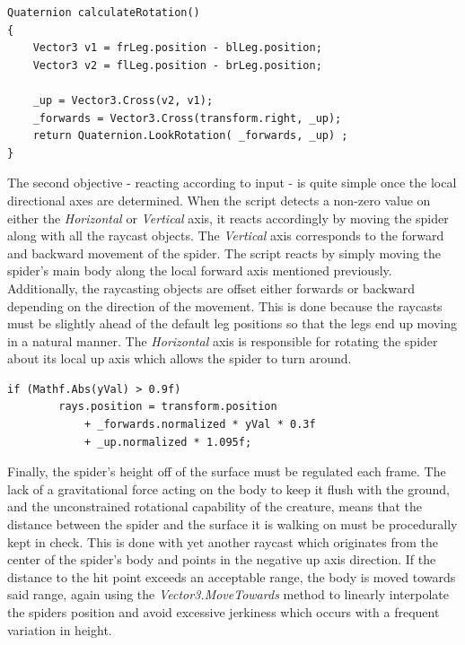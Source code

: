 \begin{lstlisting}[basicstyle=\footnotesize, numbers=none,frame=single,
caption={Calculating the spider's rotation. \textit{IKSpiderMovement.cs}},captionpos=b, label=rotation, language={[Sharp]c}]
Quaternion calculateRotation()
{
    Vector3 v1 = frLeg.position - blLeg.position;
    Vector3 v2 = flLeg.position - brLeg.position;
    
    _up = Vector3.Cross(v2, v1);
    _forwards = Vector3.Cross(transform.right, _up);
    return Quaternion.LookRotation( _forwards, _up) ;
}
\end{lstlisting}


The second objective - reacting according to input - is quite simple once the
local directional axes are determined. When the script detects a non-zero value
on either the \textit{Horizontal} or \textit{Vertical} axis, it reacts
accordingly by moving the spider along with all the raycast objects. The
\textit{Vertical} axis corresponds to the forward and backward movement of the
spider. The script reacts by simply moving the spider's main body along the
local forward axis mentioned previously. Additionally, the raycasting objects
are offset either forwards or backward depending on the direction of the
movement. This is done because the raycasts must be slightly ahead of the
default leg positions so that the legs end up moving in a natural manner.
The \textit{Horizontal} axis is responsible for rotating the spider about its
local up axis which allows the spider to turn around. 

\begin{lstlisting}[basicstyle=\footnotesize, numbers=none,frame=single,
caption={The raycasts which scan the terrain for leg placement positions are
offset in the direction in which the spider is walking. The \textit{yVal}
variable is the value of the \textit{Vertical} axis input. \textit{IKSpiderMovement.cs}},captionpos=b,
label=ray_offset, language={[Sharp]c}, float=tp]
    if (Mathf.Abs(yVal) > 0.9f)
        rays.position = transform.position
            + _forwards.normalized * yVal * 0.3f
            + _up.normalized * 1.095f;
\end{lstlisting}

Finally, the spider's height off of the surface must be regulated each frame.
The lack of a gravitational force acting on the body to keep it flush with the
ground, and the unconstrained rotational capability of the creature, means that
the distance between the spider and the surface it is walking on must be
procedurally kept in check. This is done with yet another raycast which
originates from the center of the spider's body and points in the negative up
axis direction. If the distance to the hit point exceeds an acceptable range,
the body is moved towards said range, again using the
\textit{Vector3.MoveTowards} method to linearly interpolate the spiders position
and avoid excessive jerkiness which occurs with a frequent variation in height. 



